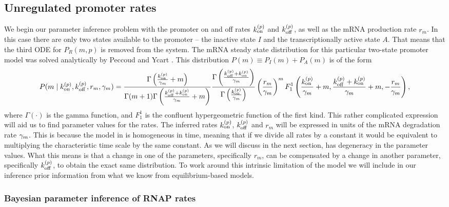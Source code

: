 \subsection{Unregulated promoter rates}

We begin our parameter inference problem with the promoter on and off rates
$k^{(p)}_{\text{on}}$ and $k^{(p)}_{\text{off}}$, as well as the mRNA production rate $r_m$. In this case
there are only two states available to the promoter -- the inactive state $I$
and the transcriptionally active  state $A$. That means that the third ODE for
$P_R(m, p)$ is removed from the system. The mRNA steady state distribution for
this particular two-state promoter model was solved analytically by Peccoud and
Ycart \cite{Peccoud1995}. This distribution $P(m) \equiv P_I(m) + P_A(m)$ is of
the form
\begin{equation}
  \small
  P(m \mid k^{(p)}_{\text{on}}, k^{(p)}_{\text{off}}, r_m, \gamma _m) =
  {\Gamma \left( \frac{k^{(p)}_{\text{on}}}{\gamma _m} + m \right) \over
  \Gamma(m + 1) \Gamma\left( \frac{k^{(p)}_{\text{off}}+k^{(p)}_{\text{on}}}{\gamma _m} + m \right)}
  {\Gamma\left( \frac{k^{(p)}_{\text{off}}+k^{(p)}_{\text{on}}}{\gamma _m} \right) \over
  \Gamma\left( \frac{k^{(p)}_{\text{on}}}{\gamma _m} \right)}
  \left( {r_m \over \gamma _m} \right)^m
  F_1^1 \left( {k^{(p)}_{\text{on}} \over \gamma _m} + m,
  {k^{(p)}_{\text{off}} + k^{(p)}_{\text{on}} \over \gamma _m} + m,
  -{r_m \over \gamma _m} \right),
  \label{seq_two_state_mRNA}
\end{equation}
where $\Gamma(\cdot)$ is the gamma function, and $F_1^1$ is the confluent
hypergeometric function of the first kind. This rather complicated expression
will aid us to find parameter values for the rates. The inferred rates $k^{(p)}_{\text{on}}$,
$k^{(p)}_{\text{off}}$ and $r_m$ will be expressed in units of the mRNA degradation rate
$\gamma _m$. This is because the model in  is homogeneous in
time, meaning that if we divide all rates by a constant it would be equivalent
to multiplying the characteristic time scale by the same constant. As we will
discuss in the next section,  has degeneracy in the
parameter values. What this means is that a change in one of the parameters,
specifically $r_m$, can be compensated by a change in another parameter,
specifically $k^{(p)}_{\text{off}}$, to obtain the exact same distribution. To work around
this intrinsic limitation of the model we will include in our inference prior
information from what we know from equilibrium-based models.

\subsubsection*{Bayesian parameter inference of RNAP rates}

